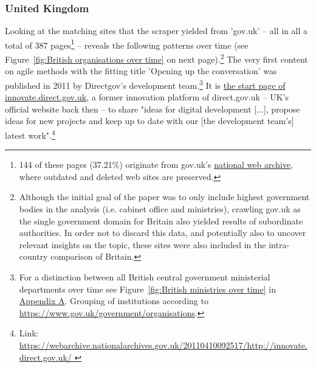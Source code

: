 \subsubsection{United Kingdom} 
Looking at the matching sites that the scraper yielded from 'gov.uk' – all in all a total of 387 pages\footnote{144 of these pages (37.21\%) originate from gov.uk's \href{https://webarchive.nationalarchives.gov.uk/search/}{national web archive}, where outdated and deleted web sites are preserved.} – reveals the following patterns over time (see Figure~\ref{fig:British organisations over time} on next page).\footnote{Although the initial goal of the paper was to only include highest government bodies in the analysis (i.e. cabinet office and ministries), crawling gov.uk as the single government domain for Britain also yielded results of subordinate authorities. In order not to discard this data, and potentially also to uncover relevant insights on the topic, these sites were also included in the intra-country comparison of Britain.} The very first content on agile methods with the fitting title 'Opening up the conversation' was published in 2011 by Directgov's development team.\footnote{For a distinction between all British central government ministerial departments over time see Figure~\ref{fig:British ministries over time} in \hyperref[Appendix A]{Appendix A}. Grouping of institutions according to \url{https://www.gov.uk/government/organisations}.} It is \href{https://webarchive.nationalarchives.gov.uk/20110410092517/http://innovate.direct.gov.uk/
}{the start page of innovate.direct.gov.uk}, a former innovation platform of direct.gov.uk – UK's official website back then – to share "ideas for digital development [...], propose ideas for new projects and keep up to date with our [the development team's] latest work".\footnote{Link: \url{https://webarchive.nationalarchives.gov.uk/20110410092517/http://innovate.direct.gov.uk/
}}
